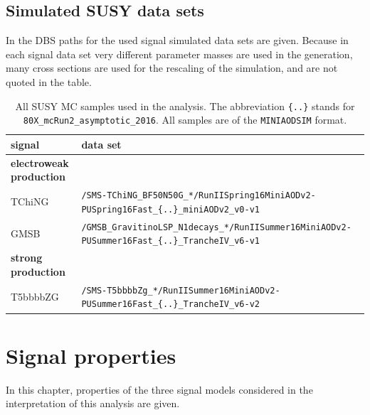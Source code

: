 \FloatBarrier
\section*{Simulated SUSY data sets}
In  the DBS paths for the used signal simulated data sets are given. Because in each signal data set very different parameter masses are used in the generation, many cross sections are used for the rescaling of the simulation, and are not quoted in the table.

\begin{table}[tb]
 \centering
 \caption{All SUSY MC samples used in the analysis. The abbreviation \texttt{\{..\}} stands for \texttt{80X\_mcRun2\_asymptotic\_2016}. All samples are of the \texttt{MINIAODSIM} format.}
 \scriptsize
 \label{tab:app_signalsets}
 \begin{tabular}[width=\textwidth]{ll}
  \hline
  \normalsize{signal}             & \normalsize{data set}   \\\hline
  \textbf{electroweak production} &                         \\
  TChiNG                          & \verb|/SMS-TChiNG_BF50N50G_*/RunIISpring16MiniAODv2-PUSpring16Fast_{..}_miniAODv2_v0-v1| \\
  GMSB                            & \verb|/GMSB_GravitinoLSP_N1decays_*/RunIISummer16MiniAODv2-PUSummer16Fast_{..}_TrancheIV_v6-v1| \\
  \textbf{strong production}      &                         \\
  T5bbbbZG                        & \verb|/SMS-T5bbbbZg_*/RunIISummer16MiniAODv2-PUSummer16Fast_{..}_TrancheIV_v6-v2| \\
  \hline
 \end{tabular}
\end{table}

\FloatBarrier

\chapter{Signal properties}\label{sec:app_signal}
In this chapter, properties of the three signal models considered in the interpretation of this analysis are given.
